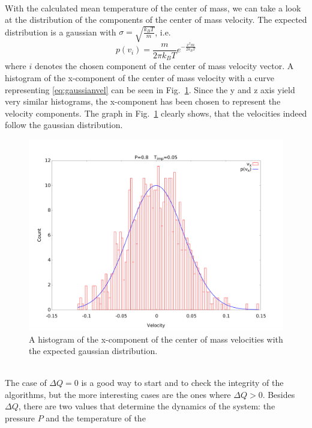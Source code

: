 \documentclass[12pt]{article}
\begin{document}
\\With the calculated mean temperature of the center of mass, we can take a look at the distribution of the components of the center of mass velocity.
The expected distribution is a gaussian with $\sigma=\sqrt{\frac{k_B T}{m}}$, i.e.
\begin{equation}
    \label{eq:gaussianvel}
    p(v_i) = \frac{m}{2\pi k_B T} e^{-\frac{x^2 m}{2 k_B T}}
\end{equation}
where $i$ denotes the chosen component of the center of mass velocity vector. A histogram of the x-component of the center of mass velocity  
with a curve representing \eqref{eq:gaussianvel} can be seen in Fig.~\ref{fig:comvel}. Since the y and z axis yield very similar histograms, the
x-component has been chosen to represent the velocity components. The graph in Fig.~\ref{fig:comvel} clearly shows, that the velocities indeed follow
the gaussian distribution.
\begin{figure}[h]
    \begin{center}
        \includegraphics[scale=0.4]{images/vcomtemp.pdf}
        \caption{A histogram of the x-component of the center of mass velocities with the expected gaussian distribution.}
        \label{fig:comvel}
    \end{center}
\end{figure}
\\The case of $\Delta Q=0$ is a good way to start and to check the integrity of the algorithms, but the more interesting cases are the ones where
$\Delta Q > 0$. Besides $\Delta Q$, there are two values that determine the dynamics of the system: the pressure $P$ and the temperature of the
\end{document}
